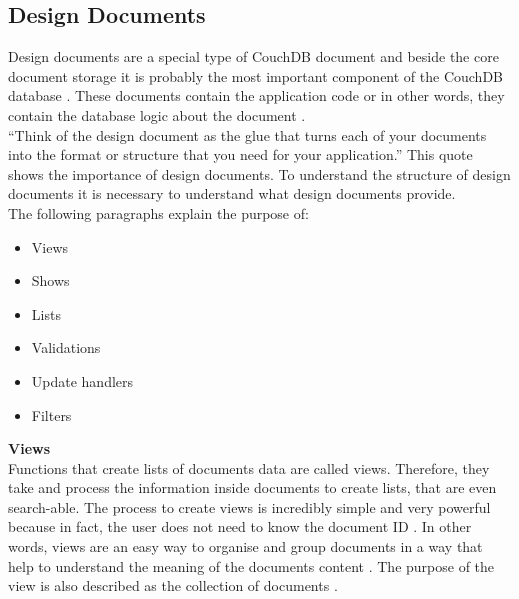 \subsection{Design Documents}
Design documents are a special type of CouchDB document and beside the core document storage it is probably the most important component of the CouchDB database \parencite{CouchDB.Guide,Brown.2012}. These documents contain the application code or in other words, they contain the database logic about the document \parencite{CouchDB.Guide,Brown.2012}. \\
``Think of the design document as the glue that turns each of your documents into the format or structure that you need for your application.'' \parencite{Brown.2012}
This quote shows the importance of design documents.
To understand the structure of design documents it is necessary to understand what design documents provide. \\
The following paragraphs explain the purpose of: 
\begin{itemize}
    \item Views
    \item Shows
    \item Lists
    \item Validations
    \item Update handlers
    \item Filters
\end{itemize}
\textbf{Views} \\
Functions that create lists of documents data are called views. Therefore, they take and process the information inside documents to create lists, that are even search-able. The process to create views is incredibly simple and very powerful because in fact, the user does not need to know the document ID \parencite{Brown.2012}. In other words, views are an easy way to organise and group documents in a way that help to understand the meaning of the documents content \parencite{CouchDB.Guide}. The purpose of the view is also described as the collection of documents \parencite{Brown.2012}. \\
